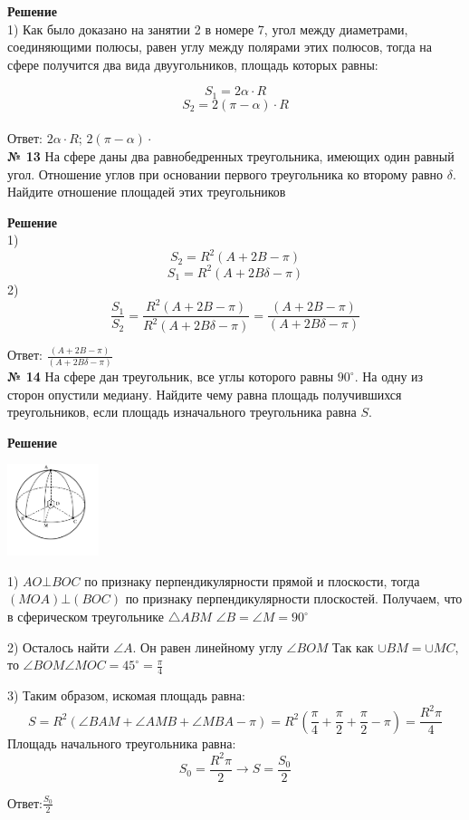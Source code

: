     \textbf{Решение}\\

    1) Как было доказано на занятии 2 в номере 7, угол между диаметрами, соединяющими полюсы,
    равен углу между полярами этих полюсов, тогда на сфере получится два вида двуугольников,
    площадь которых равны:

    \[
        S_1 = 2\alpha \cdot R
    \]
    \[
        S_2 = 2(\pi - \alpha) \cdot R
    \]\\

    Ответ: $2\alpha \cdot R $; $2(\pi - \alpha) \cdot $\\


    \textbf{№ 13}
    На сфере даны два равнобедренных треугольника, имеющих один равный угол.
    Отношение углов при основании первого треугольника ко второму равно $\delta$.
    Найдите отношение площадей этих треугольников

    \textbf{Решение}\\

    1)
    \[
        S_2 = R ^ 2(A + 2B - \pi)
    \]
    \[
        S_1 = R^2(A + 2B\delta - \pi)
    \]
    2)
    \[
        \frac{S_1}{S_2} = \frac{R ^ 2(A + 2B - \pi)}{R ^ 2(A + 2B\delta - \pi)} = \frac{(A + 2B - \pi)}{(A + 2B\delta - \pi)}
    \]

    Ответ: $\frac{(A + 2B - \pi)}{(A + 2B\delta - \pi)}$\\


    \textbf{№ 14}
    На сфере дан треугольник, все углы которого равны $90^\circ$.
    На одну из сторон опустили медиану.
    Найдите чему равна площадь получившихся треугольников, если площадь изначального треугольника равна $S$.

    \textbf{Решение}\\

    \begin{center}
        \includegraphics[width=0.2\textwidth]{images/img9}\\
    \end{center}

    1) $AO\bot BOC$ по признаку перпендикулярности прямой и плоскости, тогда $(MOA)\bot(BOC)$ по признаку перпендикулярности
    плоскостей.
    Получаем, что в сферическом треугольнике $\triangle ABM$ $\angle B = \angle M = 90^\circ$

    2) Осталось найти $\angle A$.
    Он равен линейному углу $\angle BOM$
    Так как $\cup BM = \cup MC$, то $\angle BOM \angle MOC = 45^\circ = \frac{\pi}{4}$

    3) Таким образом, искомая площадь равна:
    \[
        S = R^2(\angle BAM + \angle AMB + \angle MBA - \pi) =
        R^2\left(\frac{\pi}{4} + \frac{\pi}{2}+ \frac{\pi}{2} - \pi\right) =
        \frac{R^2\pi}{4}
    \]
    Площадь начального треугольника равна:
    \[
        S_0 = \frac{R^2\pi}{2} \rightarrow S = \frac{S_0}{2}
    \]

    Ответ:$\frac{S_0}{2}$


